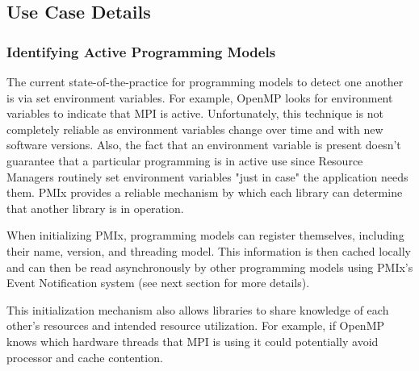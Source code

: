 \subsection{Use Case Details}

\subsubsection{Identifying Active Programming Models}

The current state-of-the-practice for programming models to detect one another is via set environment variables.  For example, OpenMP looks for environment variables to indicate that MPI is active.  Unfortunately, this technique is not completely reliable as environment variables change over time and with new software versions.  Also, the fact that an environment variable is present doesn't guarantee that a particular programming is in active use since Resource Managers routinely set environment variables "just in case" the application needs them. PMIx provides a reliable mechanism by which each library can determine that another library is in operation.

When initializing PMIx, programming models can register themselves, including their name, version, and threading model.  This information is then cached locally and can then be read asynchronously by other programming models using PMIx's Event Notification system (see next section for more details).

This initialization mechanism also allows libraries to share knowledge of each other's resources and intended resource utilization. For example, if OpenMP knows which hardware threads that MPI is using it could potentially avoid processor and cache contention.




{\large {}}



